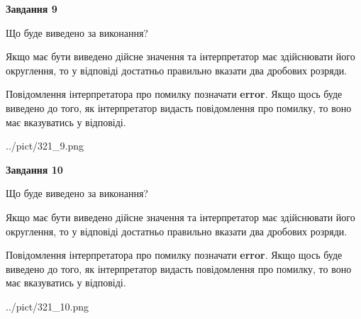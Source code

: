 \documentclass[12pt, ukrainian]{article}
\begin{document}
{\begin {Large}
{\begin {center}\textbf{Завдання 9}\end {center}}\par
Що буде виведено за виконання? \par

Якщо має бути виведено дійсне значення та інтерпретатор має здійснювати його округлення, 
то у відповіді достатньо правильно вказати два дробових розряди.

Повідомлення інтерпретатора про помилку позначати \textbf{error}.
Якщо щось буде виведено до того, як інтерпретатор видасть повідомлення про помилку, 
то воно має вказуватись у відповіді. \par

\begin{center}
	{../pict/321_9.png}
\end{center}
\newpage

{\begin {center}\textbf{Завдання 10}\end {center}}\par
Що буде виведено за виконання? \par

Якщо має бути виведено дійсне значення та інтерпретатор має здійснювати його округлення, 
то у відповіді достатньо правильно вказати два дробових розряди.

Повідомлення інтерпретатора про помилку позначати \textbf{error}.
Якщо щось буде виведено до того, як інтерпретатор видасть повідомлення про помилку, 
то воно має вказуватись у відповіді. \par

\begin{center}
	{../pict/321_10.png}
\end{center}
\newpage

\end {Large}}
\end{document}
